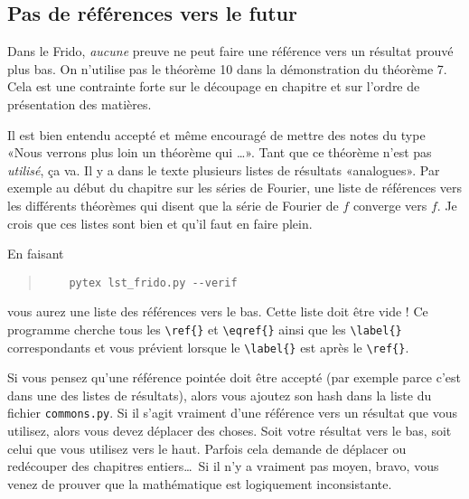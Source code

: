 \documentclass[a4paper,12pt]{article}
\newcommand{\info}[1]{\texttt{#1}}
\begin{document}
\subsection{Pas de références vers le futur}

Dans le Frido, \emph{aucune} preuve ne peut faire une référence vers un résultat prouvé plus bas. On n'utilise pas le théorème 10 dans la démonstration du théorème 7. Cela est une contrainte forte sur le découpage en chapitre et sur l'ordre de présentation des matières.

Il est bien entendu accepté et même encouragé de mettre des notes du type «Nous verrons plus loin un théorème qui \ldots». Tant que ce théorème n'est pas \emph{utilisé}, ça va. Il y a dans le texte plusieurs listes de résultats «analogues». Par exemple au début du chapitre sur les séries de Fourier, une liste de références vers les différents théorèmes qui disent que la série de Fourier de \( f\) converge vers \( f\).  Je crois que ces listes sont bien et qu'il faut en faire plein.

En faisant
\begin{quote}
    \begin{verbatim}
    pytex lst_frido.py --verif
    \end{verbatim}
\end{quote}
vous aurez une liste des références vers le bas. Cette liste doit être vide ! Ce programme cherche tous les \verb+\ref{}+ et \verb+\eqref{}+ ainsi que les \verb+\label{}+ correspondants et vous prévient lorsque le \verb+\label{}+ est après le \verb+\ref{}+.

Si vous pensez qu'une référence pointée doit être accepté (par exemple parce c'est dans une des listes de résultats), alors vous ajoutez son hash dans la liste du fichier \info{commons.py}. Si il s'agit vraiment d'une référence vers un résultat que vous utilisez, alors vous devez déplacer des choses. Soit votre résultat vers le bas, soit celui que vous utilisez vers le haut. Parfois cela demande de déplacer ou redécouper des chapitres entiers\ldots\ Si il n'y a vraiment pas moyen, bravo, vous venez de prouver que la mathématique est logiquement inconsistante.
\end{document}
